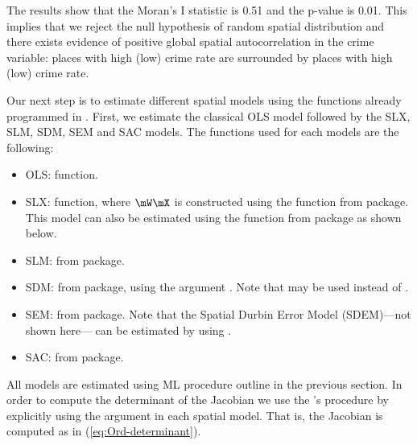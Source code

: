 The results show that the Moran's I statistic is 0.51 and the p-value is 0.01. This implies that we reject the null hypothesis of random spatial distribution and there exists evidence of positive global spatial autocorrelation in the crime variable: places with high (low) crime rate are surrounded by places with high (low) crime rate. 

Our next step is to estimate different spatial models using the functions already programmed in . First, we estimate the classical OLS model followed by the SLX, SLM, SDM, SEM and SAC models. The functions used for each models are the following:

\begin{itemize}
  \item OLS:  function.
  \item SLX:  function, where $\mW\mX$ is constructed using the function  from  package. This model can also be estimated using the function  from  package as shown below. 
  \item SLM:  from  package.  
  \item SDM:  from  package, using the argument . Note that  may be used instead of . 
  \item SEM:  from  package. Note that the Spatial Durbin Error Model (SDEM)---not shown here--- can be estimated by using  . 
  \item SAC:  from  package.
\end{itemize}

All models are estimated using ML procedure outline in the previous section. In order to compute the determinant of the Jacobian we use the \cite{ord1975estimation}'s procedure by explicitly using the argument  in each spatial model. That is, the Jacobian is computed as in (\ref{eq:Ord-determinant}).

